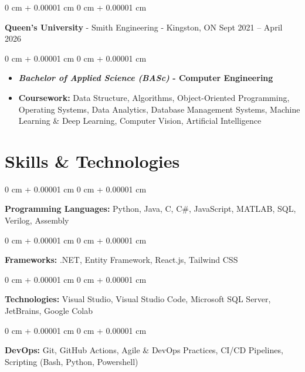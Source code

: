 \documentclass[10pt, letterpaper]{article}
\newenvironment{highlights}{
    \begin{itemize}[
        topsep=0.10 cm,
        parsep=0.10 cm,
        partopsep=0pt,
        itemsep=0pt,
        leftmargin=0 cm + 10pt
    ]
}{
    \end{itemize}
} %
\newenvironment{onecolentry}{
    \begin{adjustwidth}{
        0 cm + 0.00001 cm
    }{
        0 cm + 0.00001 cm
    }
}{
    \end{adjustwidth}
} %
\newenvironment{twocolentry}[2][]{
    \onecolentry
    \def\secondColumn{#2}
    \setcolumnwidth{\fill, 4.5 cm}
    \begin{paracol}{2}
}{
    \switchcolumn \raggedleft \secondColumn
    \end{paracol}
    \endonecolentry
} %
\begin{document}
    \begin{twocolentry}{
        Sept 2021 – April 2026
    }
        \textbf{Queen's University} - Smith Engineering - Kingston, ON\end{twocolentry}

    \vspace{0.10 cm}
    \begin{onecolentry}
        \begin{highlights}
            \item \textbf{\textit{Bachelor of Applied Science (BASc)} - Computer Engineering}
            \item \textbf{Coursework:} Data Structure, Algorithms, Object-Oriented Programming, Operating Systems, Data Analytics, Database Management Systems, Machine Learning \& Deep Learning, Computer Vision, Artificial Intelligence
        \end{highlights}
    \end{onecolentry}

    \section{Skills \& Technologies}
    
    \begin{onecolentry}
        \textbf{Programming Languages:} Python, Java, C, C\#, JavaScript, MATLAB, SQL, Verilog, Assembly
    \end{onecolentry}
    
    \vspace{0.05 cm}
    
    \begin{onecolentry}
        \textbf{Frameworks:} .NET, Entity Framework, React.js, Tailwind CSS
    \end{onecolentry}
    
    \vspace{0.05 cm}
    
    \begin{onecolentry}
        \textbf{Technologies:} Visual Studio, Visual Studio Code, Microsoft SQL Server, JetBrains, Google Colab
    \end{onecolentry}
    
    \begin{onecolentry}
        \textbf{DevOps:} Git, GitHub Actions, Agile \& DevOps Practices, CI/CD Pipelines, Scripting (Bash, Python, Powershell)
    \end{onecolentry}
    
\end{document}
